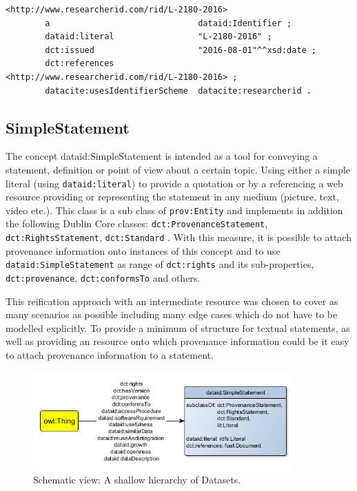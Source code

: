 \documentclass[a4paper,english,twoside,BCOR1.5cm,headsepline,DIV12,appendixprefix,final,12pt]{scrbook}
\newcommand{\prop}[1]{{{\texttt{#1}}}}
\begin{document}
\begin{lstlisting}[language=ttl, captionpos=b,caption=Example of an organisation,label=lst:coresuperset,linewidth=\columnwidth,breaklines=true]
<http://www.researcherid.com/rid/L-2180-2016>
        a                              dataid:Identifier ;
        dataid:literal                 "L-2180-2016" ;                                        
        dct:issued                     "2016-08-01"^^xsd:date ;
        dct:references                 <http://www.researcherid.com/rid/L-2180-2016> ;        
        datacite:usesIdentifierScheme  datacite:researcherid .  
\end{lstlisting}

\subsection{SimpleStatement} 
\label{sec:corestatement}
The concept dataid:SimpleStatement is intended as a tool for conveying a statement, definition or point of view about a certain topic. Using either a simple literal (using \prop{dataid:literal}) to provide a quotation or by a referencing a web resource providing or representing the statement in any medium (picture, text, video etc.). This class is a sub class of \prop{prov:Entity} and implements in addition the following Dublin Core classes: \prop{dct:ProvenanceStatement}, 
\prop{dct:RightsStatement},
\prop{dct:Standard}
. With this measure, it is possible to attach provenance information onto instances of this concept and to use \prop{dataid:SimpleStatement} as range of \prop{dct:rights} and its sub-properties, \prop{dct:provenance}, \prop{dct:conformsTo} and others.

This reification approach with an intermediate resource was chosen to cover as many scenarios as possible including many edge cases which do not have to be modelled explicitly. To provide a minimum of structure for textual statements, as well as providing an resource onto which provenance information could be it easy to attach provenance information to a statement. 

\begin{figure}[!htbp]
\centering
  \includegraphics[width=10cm]{images/ClassSimpleStatement.png}
  \caption{Schematic view: A shallow hierarchy of Datasets.}
  \label{fig:example}
\end{figure}
\end{document}
